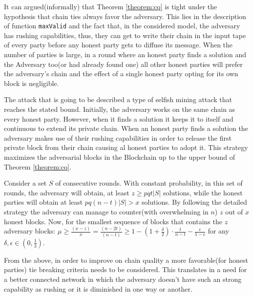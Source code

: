 \documentclass[..]{subfiles}
\begin{document}
\begin{remark}\label{rem:hurting_cq}
	\normalfont
	It can argued(informally) that Theorem \ref{theorem:cq} is tight under the hypothesis that chain ties always favor the adversary. This lies in the description of function \texttt{maxValid} and the fact that, in the considered model, the adversary has rushing capabilities, thus, they can get to write their chain in the input tape of every party before any honest party gets to diffuse its message. When the number of parties is large, in a round where an honest party finds a solution and the Adversary too(or had already found one) all other honest parties will prefer the adversary's chain and the effect of a single honest party opting for its own block is negligible.

	The attack that is going to be described a type of selfish mining attack that reaches the stated bound. Initially, the adversary works on the same chain as every honest party. However, when it finds a solution it keeps it to itself and continuous to extend its private chain. When an honest party finds a solution the adversary makes use of their rushing capabilities in order to release the first private block from their chain causing al honest parties to adopt it. This strategy maximizes the adversarial blocks in the Blockchain up to the upper bound of Theorem \ref{theorem:cq}.
	 
	Consider a set $S$ of consecutive rounds. With constant probability, in this set of rounds, the adversary will obtain, at least $z \ge pqt|S|$ solutions, while the honest parties will obtain at least $pq(n-t)|S| > x$ solutions. By following the detailed strategy the adversary can manage to counter(with overwhelming in $n$) $z$ out of $x$ honest blocks. Now, for the smallest sequence of blocks that contains the $z$ adversary blocks: $\mu \ge \frac{(x-z)}{x} = \frac{(n-2t)}{(n-t)} \ge 1 - (1+\frac{\delta}{2}) \cdot \frac{t}{n-t} - \frac{\epsilon}{1-\epsilon}$ for any $\delta, \epsilon \in (0, \frac{1}{3})$.

	From the above, in order to improve on chain quality a more favorable(for honest parties) tie breaking criteria needs to be considered. This translates in a need for a better connected network in which the adversary doesn't have such an strong capability as rushing or it is diminished in one way or another.
\end{remark}
\end{document}
